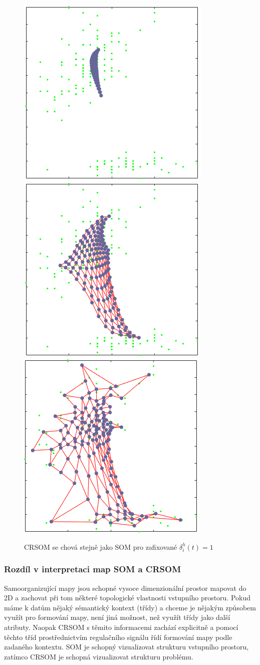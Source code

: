 \documentclass[thesis=M,czech]{FITthesis}[2012/06/26]
\begin{document}
\begin{figure}[htp]
    \centering
    
    \includegraphics[width=.32\textwidth]{s1.png}
    \includegraphics[width=.32\textwidth]{s2.png}
    \includegraphics[width=.32\textwidth]{s3.png}
    \caption{CRSOM se chová stejně jako SOM pro zafixované $ \delta_i^h(t) = 1 $ }
    \label{fig:delta_1}
\end{figure}


\subsubsection*{Rozdíl v interpretaci map SOM a CRSOM}
Samoorganizující mapy jsou schopné vysoce dimenzionální prostor mapovat do 2D a zachovat při tom některé topologické vlastnosti vstupního prostoru. Pokud máme k datům nějaký sémantický kontext (třídy) a chceme je nějakým způsobem využít pro formování mapy, není jiná možnost, než využít třídy jako další atributy. Naopak CRSOM s těmito informacemi zachází explicitně a pomocí těchto tříd prostřednictvím regulačního signálu řídí formování mapy podle zadaného kontextu. SOM je schopný vizualizovat strukturu vstupního prostoru, zatímco CRSOM je schopná vizualizovat strukturu problému.~\cite{hartono13}
\end{document}
